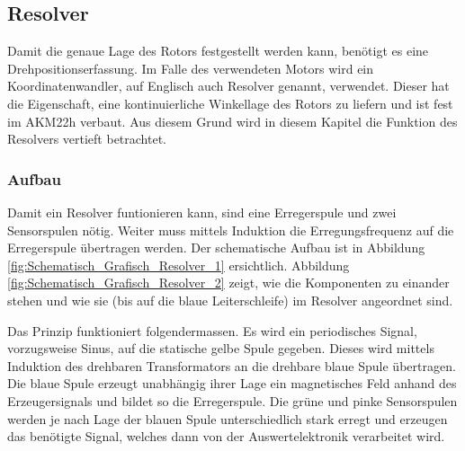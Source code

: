 \subsection{Resolver}\label{subsubsec:Resolver}

Damit die genaue Lage des Rotors festgestellt werden kann, benötigt es eine Drehpositionserfassung. Im Falle des verwendeten Motors wird ein Koordinatenwandler, auf Englisch auch Resolver genannt, verwendet.
Dieser hat die Eigenschaft, eine kontinuierliche Winkellage des Rotors zu liefern und ist fest im AKM22h verbaut. Aus diesem Grund wird in diesem Kapitel die Funktion des Resolvers vertieft betrachtet.

\subsubsection{Aufbau}\label{par:Aufbau_Resolver}

Damit ein Resolver funtionieren kann, sind eine Erregerspule und zwei Sensorspulen nötig.
Weiter muss mittels Induktion die Erregungsfrequenz auf die Erregerspule übertragen werden.
Der schematische Aufbau ist in Abbildung  \ref{fig:Schematisch_Grafisch_Resolver_1} ersichtlich. Abbildung \ref{fig:Schematisch_Grafisch_Resolver_2} zeigt, wie die Komponenten zu einander stehen und wie sie (bis auf die blaue Leiterschleife) im Resolver angeordnet sind.

Das Prinzip funktioniert folgendermassen. Es wird ein periodisches Signal, vorzugsweise Sinus, auf die statische gelbe Spule gegeben. Dieses wird mittels Induktion des drehbaren Transformators an die drehbare blaue Spule übertragen. Die blaue Spule erzeugt unabhängig ihrer Lage ein magnetisches Feld anhand des Erzeugersignals und bildet so die Erregerspule. Die grüne und pinke Sensorspulen werden je nach Lage der blauen Spule unterschiedlich stark erregt und erzeugen das benötigte Signal, welches dann von der Auswertelektronik verarbeitet wird. 

